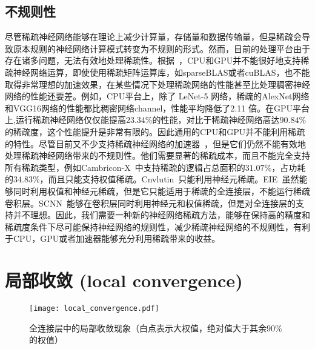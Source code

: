 \subsection{不规则性}
尽管稀疏神经网络能够在理论上减少计算量，存储量和数据传输量，但是稀疏会导致原本规则的神经网络计算模式转变为不规则的形式。然而，目前的处理平台由于存在诸多问题，无法有效地处理稀疏性。根据~\cite{zhang2016cambricon}，CPU和GPU并不能很好地支持稀疏神经网络运算，即使使用稀疏矩阵运算库，如sparseBLAS或者cuBLAS，也不能取得非常理想的加速效果，在某些情况下处理稀疏网络的性能甚至比处理稠密神经网络的性能还要差。例如，CPU平台上，除了 LeNet-5 网络，稀疏的AlexNet网络和VGG16网络的性能都比稠密网络channel，性能平均降低了2.11 倍。在GPU平台上,运行稀疏神经网络仅仅能提高$23.34\%$的性能，对比于稀疏神经网络高达$90.84\%$的稀疏度，这个性能提升是非常有限的。因此通用的CPU和GPU并不能利用稀疏的特性。尽管目前又不少支持稀疏神经网络的加速器~\cite{zhang2016cambricon, albericio2016cnvlutin, han2016eie, han2017ese, angshuman2017scnn}，但是它们仍然不能有效地处理稀疏神经网络带来的不规则性。他们需要显著的稀疏成本，而且不能完全支持所有稀疏类型，例如Cambricon-X~\cite{zhang2016cambricon}中支持稀疏的逻辑占总面积的$31.07\%$，占功耗的$34.83\%$，而且只能支持权值稀疏。Cnvlutin~\cite{albericio2016cnvlutin}只能利用神经元稀疏。EIE~\cite{han2016eie}虽然能够同时利用权值和神经元稀疏，但是它只能适用于稀疏的全连接层，不能运行稀疏卷积层。SCNN~\cite{angshuman2017scnn}能够在卷积层同时利用神经元和权值稀疏，但是对全连接层的支持并不理想。因此，我们需要一种新的神经网络稀疏方法，能够在保持高的精度和稀疏度条件下尽可能保持神经网络的规则性，减少稀疏神经网络的不规则性，有利于CPU，GPU或者加速器能够充分利用稀疏带来的收益。


\section{局部收敛 (local convergence)}

\begin{figure}[h]
  \centering
  \texttt{[image: local\_convergence.pdf]}
  \caption{全连接层中的局部收敛现象（白点表示大权值，绝对值大于其余$90\%$的权值）}
  \label{fig:local_convergence}
\end{figure}

